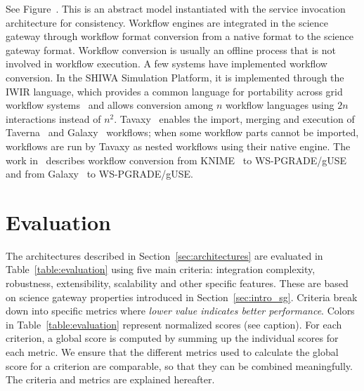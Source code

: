 \documentclass[preprint,3p,twocolumn]{elsarticle}
\begin{document}
See Figure~. This is an abstract model
instantiated with the service invocation architecture for
consistency. Workflow engines are integrated in the science gateway
through workflow format conversion from a native format to the science
gateway format. Workflow conversion
is usually an offline process that is not involved in workflow
execution. A few systems have implemented workflow conversion. In the
SHIWA Simulation Platform, it is implemented through the IWIR
language, which provides a common language for portability across grid
workflow systems~\cite{plankensteiner-prodan-etal:2013} and allows
conversion among $n$ workflow languages using $2n$ interactions
instead of $n^2$.  Tavaxy~\cite{Abouelhoda2012} enables the import,
merging and execution of Taverna~\cite{oinn2004taverna} and
Galaxy~\cite{goecks2010galaxy} workflows; when some workflow parts
cannot be imported, workflows are run by Tavaxy as nested workflows
using their native engine. The work in~\cite{delaGarza2016} describes
workflow conversion from KNIME~\cite{Berthold2008} to WS-PGRADE/gUSE
and from Galaxy~\cite{goecks2010galaxy} to WS-PGRADE/gUSE.


\section{Evaluation}

\label{sec:evaluation}

The architectures described in Section~\ref{sec:architectures} are
evaluated in Table~\ref{table:evaluation} using five main criteria:
integration complexity, robustness, extensibility, scalability and
other specific features. These are based on science gateway properties
introduced in Section~\ref{sec:intro_sg}. Criteria break down into
specific metrics where \emph{lower value indicates better
  performance}. Colors in Table~\ref{table:evaluation} represent
normalized scores (see caption). For each
criterion, a global score is computed by summing up the individual
scores for each metric. We ensure that the different metrics used to
calculate the global score for a criterion are comparable, so that
they can be combined meaningfully. The criteria and metrics are
explained hereafter.
\end{document}
